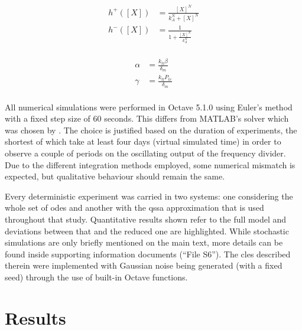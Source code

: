   \begin{multicols}{2}
    \begin{equation*}
      \begin{aligned}
        h^+([X]) &= \frac{[X]^N}{k_A^N + [X]^N} \\
        h^-([X]) &= \frac{1}{1 + \frac{[X]^N}{k_A^N}} \\
      \end{aligned}
    \end{equation*}

    \columnbreak

    \begin{equation*}
      \begin{aligned}
        \alpha &= \frac{k_{tl} \beta}{\delta_m} \\
        \gamma &= \frac{k_{tl} P_{tc}}{\delta_m} \\
      \end{aligned}
    \end{equation*}
  \end{multicols}

  All numerical simulations were performed in Octave 5.1.0 using Euler's method with a fixed step size of $60$ seconds.
  This differs from MATLAB's  solver which was chosen by \citet{multif}.
  The choice is justified based on the duration of experiments, the shortest of which take at least four days (virtual simulated time) in order to observe a couple of periods on the oscillating output of the frequency divider.
  Due to the different integration methods employed, some numerical mismatch is expected, but qualitative behaviour should remain the same.

  Every deterministic experiment was carried in two systems: one considering the whole set of \ac{ode}s and another with the \ac{qssa} approximation that is used throughout that study.
  Quantitative results shown refer to the full model and deviations between that and the reduced one are highlighted.
  While stochastic simulations are only briefly mentioned on the main text, more details can be found inside supporting information documents (``File S6'').
  The \ac{cles} described therein were implemented with Gaussian noise being generated (with a fixed seed) through the use of built-in Octave functions.


\section{Results}

